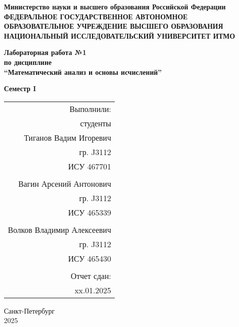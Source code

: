 \documentclass[a4paper,12pt]{article}
\begin{document}
\thispagestyle{empty} %

\begin{center}
    \textbf{Министерство науки и высшего образования Российской Федерации}\\
    \textbf{ФЕДЕРАЛЬНОЕ ГОСУДАРСТВЕННОЕ АВТОНОМНОЕ ОБРАЗОВАТЕЛЬНОЕ УЧРЕЖДЕНИЕ ВЫСШЕГО ОБРАЗОВАНИЯ НАЦИОНАЛЬНЫЙ ИССЛЕДОВАТЕЛЬСКИЙ УНИВЕРСИТЕТ ИТМО}
\end{center}

\vspace{1cm}

\begin{center}
    \textbf{Лабораторная работа №1}\\
    \textbf{по дисциплине}\\
    \textbf{``Математический анализ и основы исчислений''}
\end{center}

\vspace{1cm}

\begin{center}
    \textbf{Семестр I}
\end{center}

\vspace{2cm}

\begin{flushright}
    \begin{tabular}{r}
        Выполнили: \\ \vspace{0.5cm}
        студенты \\ 
        Тиганов Вадим Игоревич \\
        гр. J3112 \\
        ИСУ 467701 \\
        \\
        Вагин Арсений Антонович \\
        гр. J3112 \\
        ИСУ 465339 \\
        \\
        Волков Владимир Алексеевич \\
        гр. J3112 \\
        ИСУ 465430\\
        \\
        Отчет сдан: \\
        xx.01.2025
    \end{tabular}
\end{flushright}

\vspace{5cm}

\begin{center}
    Санкт-Петербург \\
    2025
\end{center}





\end{document}
